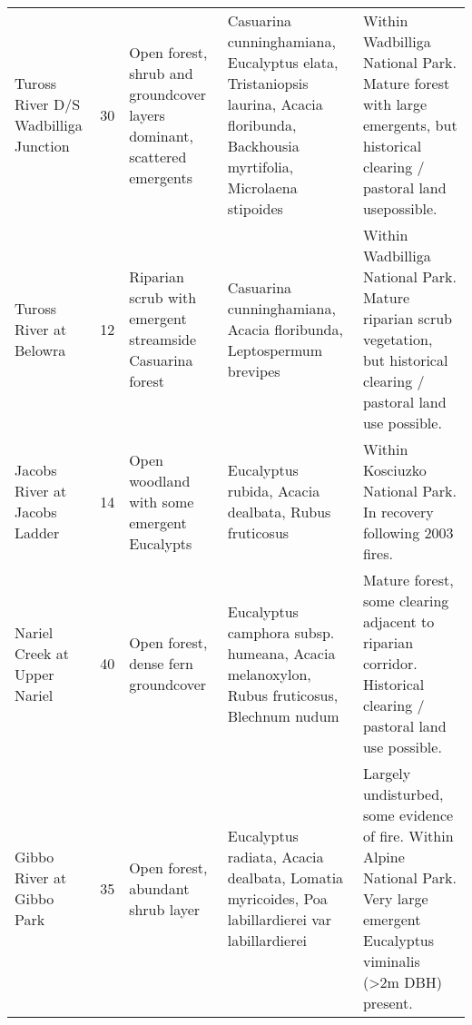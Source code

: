 \begin{table}[]
\begin{tabular}{lllll}
Tuross River D/S Wadbilliga Junction   & 30                & Open forest, shrub and groundcover layers dominant, scattered emergents & Casuarina cunninghamiana, Eucalyptus elata, Tristaniopsis laurina, Acacia floribunda, Backhousia myrtifolia, Microlaena stipoides         & Within Wadbilliga National Park. Mature forest with large emergents, but historical clearing / pastoral land usepossible.                                                                              \\
Tuross River at Belowra                & 12                & Riparian scrub with emergent streamside Casuarina forest                & Casuarina cunninghamiana, Acacia floribunda, Leptospermum brevipes                                                                        & Within Wadbilliga National Park. Mature riparian scrub vegetation, but historical clearing / pastoral land use possible.                                                                               \\
Jacobs River at Jacobs Ladder          & 14                & Open woodland with some emergent Eucalypts                              & Eucalyptus rubida, Acacia dealbata, Rubus fruticosus                                                                                      & Within Kosciuzko National Park. In recovery following 2003 fires.                                                                                                                                      \\
Nariel Creek at Upper Nariel           & 40                & Open forest, dense fern groundcover                                     & Eucalyptus camphora subsp. humeana, Acacia melanoxylon, Rubus fruticosus, Blechnum nudum                                                  & Mature forest, some clearing adjacent to riparian corridor. Historical clearing / pastoral land use possible.                                                                                          \\
Gibbo River at Gibbo Park              & 35                & Open forest, abundant shrub layer                                       & Eucalyptus radiata, Acacia dealbata, Lomatia myricoides, Poa labillardierei var labillardierei                                            & Largely undisturbed, some evidence of fire. Within Alpine National Park. Very large emergent Eucalyptus viminalis (>2m DBH) present.                                                                                       \\

\end{tabular}
\end{table}
